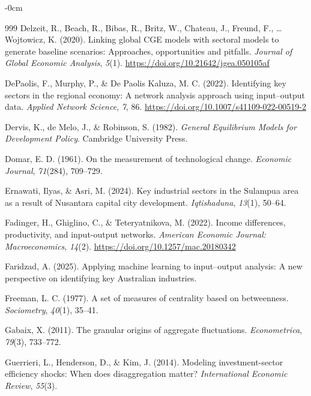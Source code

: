 \documentclass[journal,article,submit,pdftex,moreauthors]{Definitions/mdpi}
\begin{document}
\begin{adjustwidth}{-\extralength}{0cm}
{\begin{thebibliography}{999}
Delzeit, R., Beach, R., Bibas, R., Britz, W., Chateau, J., Freund, F., \ldots Wojtowicz, K. (2020). Linking global CGE models with sectoral models to generate baseline scenarios: Approaches, opportunities and pitfalls. \textit{Journal of Global Economic Analysis}, \textit{5}(1). \url{https://doi.org/10.21642/jgea.050105af}

DePaolis, F., Murphy, P., \& De Paolis Kaluza, M. C. (2022). Identifying key sectors in the regional economy: A network analysis approach using input--output data. \textit{Applied Network Science}, \textit{7}, 86. \url{https://doi.org/10.1007/s41109-022-00519-2}

Dervis, K., de Melo, J., \& Robinson, S. (1982). \textit{General Equilibrium Models for Development Policy}. Cambridge University Press.

Domar, E. D. (1961). On the measurement of technological change. \textit{Economic Journal}, \textit{71}(284), 709--729.

Ernawati, Ilyas, \& Asri, M. (2024). Key industrial sectors in the Sulampua area as a result of Nusantara capital city development. \textit{Iqtishaduna}, \textit{13}(1), 50--64.

Fadinger, H., Ghiglino, C., \& Teteryatnikova, M. (2022). Income differences, productivity, and input-output networks. \textit{American Economic Journal: Macroeconomics}, \textit{14}(2). \url{https://doi.org/10.1257/mac.20180342}

Faridzad, A. (2025). Applying machine learning to input--output analysis: A new perspective on identifying key Australian industries.

Freeman, L. C. (1977). A set of measures of centrality based on betweenness. \textit{Sociometry}, \textit{40}(1), 35--41.

Gabaix, X. (2011). The granular origins of aggregate fluctuations. \textit{Econometrica}, \textit{79}(3), 733--772.

Guerrieri, L., Henderson, D., \& Kim, J. (2014). Modeling investment-sector efficiency shocks: When does disaggregation matter? \textit{International Economic Review}, \textit{55}(3).


\end{thebibliography}}
\end{adjustwidth}
\end{document}
